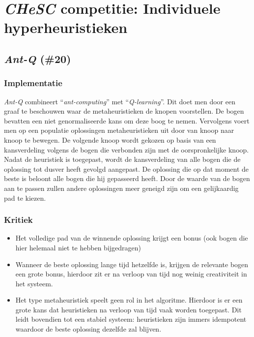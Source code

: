 \chapter{\emph{CHeSC} competitie: Individuele hyperheuristieken}


\section{\emph{Ant-Q} (\#20)}
\label{sss:ant-q}
\subsection{Implementatie}
\emph{Ant-Q}\cite{chesc-ant-q,sis/ant-q} combineert ``\emph{ant-computing}''\cite{Michael:2009:AC:1596832.1596835} met ``\emph{Q-learning}''\cite{citeulike:5925674}. Dit doet men door een graaf te beschouwen waar de metaheuristieken de knopen voorstellen. De bogen bevatten een niet genormaliseerde kans om deze boog te nemen. Vervolgens voert men op een populatie oplossingen metaheuristieken uit door van knoop naar knoop te bewegen. De volgende knoop wordt gekozen op basis van een kansverdeling volgens de bogen die verbonden zijn met de oorspronkelijke knoop. Nadat de heuristiek is toegepast, wordt de kansverdeling van alle bogen die de oplossing tot dusver heeft gevolgd aangepast. De oplossing die op dat moment de beste is beloont alle bogen die hij gepasseerd heeft. Door de waarde van de bogen aan te passen zullen andere oplossingen meer geneigd zijn om een gelijkaardig pad te kiezen.
\subsection{Kritiek}
\begin{itemize}
 \item Het volledige pad van de winnende oplossing krijgt een bonus (ook bogen die hier helemaal niet te hebben bijgedragen)
 \item Wanneer de beste oplossing lange tijd hetzelfde is, krijgen de relevante bogen een grote bonus, hierdoor zit er na verloop van tijd nog weinig creativiteit in het systeem.
 \item Het type metaheuristiek speelt geen rol in het algoritme. Hierdoor is er een grote kans dat \abls{} heuristieken na verloop van tijd vaak worden toegepast. Dit leidt bovendien tot een stabiel systeem: \abls{} heuristieken zijn immers idempotent waardoor de beste oplossing dezelfde zal blijven.
\end{itemize}
